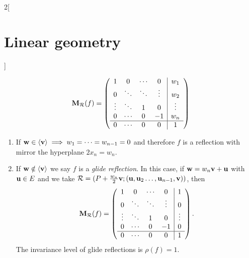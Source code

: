 \documentclass[../../../main.tex]{subfiles}
\begin{document}
\begin{multicols}{2}[\section{Linear geometry}]
\begin{prop}
    $$\boldsymbol{\mathrm{M}}_\mathcal{R}(f)=\left(
      \begin{array}{cccc|c}
          1      & 0      & \cdots & 0      & w_1    \\
          0      & \ddots & \ddots & \vdots & w_2    \\
          \vdots & \ddots & 1      & 0      & \vdots \\
          0      & \cdots & 0      & -1     & w_n    \\
          \hline
          0      & \cdots & 0      & 0      & 1      \\
        \end{array}\right)$$
    \begin{enumerate}
      \item If $\boldsymbol{\mathrm{w}}\in\langle\boldsymbol{\mathrm{v}}\rangle\implies w_1=\cdots =w_{n-1}=0$ and therefore $f$ is a reflection with mirror the hyperplane $2x_n=w_n$.
      \item If $\boldsymbol{\mathrm{w}}\notin\langle\boldsymbol{\mathrm{v}}\rangle$ we say $f$ is a \textit{glide reflection}. In this case, if $\boldsymbol{\mathrm{w}}=w_n\boldsymbol{\mathrm{v}}+\boldsymbol{\mathrm{u}}$ with $\boldsymbol{\mathrm{u}}\in E$ and we take $\mathcal{R}=(P+\frac{w_n}{2}\boldsymbol{\mathrm{v}};(\boldsymbol{\mathrm{u}},\boldsymbol{\mathrm{u}}_2\ldots, \boldsymbol{\mathrm{u}}_{n-1},\boldsymbol{\mathrm{v}}))$, then $$\boldsymbol{\mathrm{M}}_\mathcal{R}(f)=\left(
              \begin{array}{cccc|c}
                  1      & 0      & \cdots & 0      & 1      \\
                  0      & \ddots & \ddots & \vdots & 0      \\
                  \vdots & \ddots & 1      & 0      & \vdots \\
                  0      & \cdots & 0      & -1     & 0      \\
                  \hline
                  0      & \cdots & 0      & 0      & 1      \\
                \end{array}\right).$$ The invariance level of glide reflections is $\rho(f)=1$.
    \end{enumerate}
  \end{prop}

\end{multicols}
\end{document}
